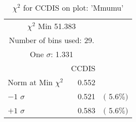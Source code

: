  \begin{table}[h!]\centering
 {\small{
 \begin{tabular}{||l||r||r||}
 \hline
 \hline
\multicolumn{2}{||c||}{$\chi^{2}$ Min  51.383} & \\
 \multicolumn{2}{||c||}{Number of bins used:   29.} & \\
\multicolumn{2}{||c||}{One $\sigma$:    1.331} & \\
 \hline
 \hline
    & CCDIS & \\
Norm at Min $\chi^{2}$  &   0.552 & \\
$-1$ $\sigma$ &   0.521  &  $($  5.6$\%)$  \\
$+1$ $\sigma$ &   0.583  &  $($  5.6$\%)$  \\
 \hline
 \hline
 \end{tabular}
 \caption{$\chi^{2}$ for CCDIS on plot: 'Mmumu'}
 \label{tab-chiccdis}
 }}
 \end{table}
 \endinput
